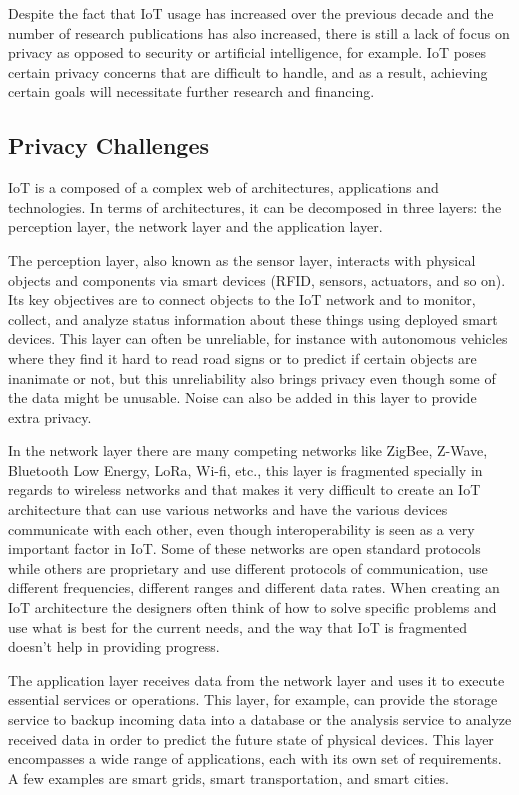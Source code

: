 Despite the fact that IoT usage has increased over the previous decade and
the number of research publications has also increased, there is still a lack
of focus on privacy as opposed to security or artificial intelligence, for
example. IoT poses certain privacy concerns that are difficult to handle, and
as a result, achieving certain goals will necessitate further research and
financing.

\subsection{Privacy Challenges}

IoT is a composed of a complex web of architectures, applications and technologies.
In terms of architectures, it can be decomposed in three layers: the perception
layer, the network layer and the application layer.

The perception layer, also known as the sensor layer, interacts with physical
objects and components via smart devices (RFID, sensors, actuators, and
so on). Its key objectives are to connect objects to the IoT network and
to monitor, collect, and analyze status information about these things using
deployed smart devices. This layer can often be unreliable, for instance
with autonomous vehicles where they find it hard to read road signs or to
predict if certain objects are inanimate or not, but this unreliability
also brings privacy even though some of the data might be unusable. Noise
can also be added in this layer to provide extra privacy.

In the network layer there are many competing networks like ZigBee, Z-Wave,
Bluetooth Low Energy, LoRa, Wi-fi, etc., this layer is fragmented specially
in regards to wireless networks and that makes it very difficult to create
an IoT architecture that can use various networks and have the various
devices communicate with each other, even though interoperability is seen
as a very important factor in IoT. Some of these networks are open standard
protocols while others are proprietary and use different protocols of communication,
use different frequencies, different ranges and different data rates. When
creating an IoT architecture the designers often think of how to solve
specific problems and use what is best for the current needs, and the way
that IoT is fragmented doesn't help in providing progress.

The application layer receives data from the network layer and uses it to
execute essential services or operations. This layer, for example, can provide
the storage service to backup incoming data into a database or the analysis
service to analyze received data in order to predict the future state of
physical devices. This layer encompasses a wide range of applications, each
with its own set of requirements. A few examples are smart grids, smart
transportation, and smart cities.

